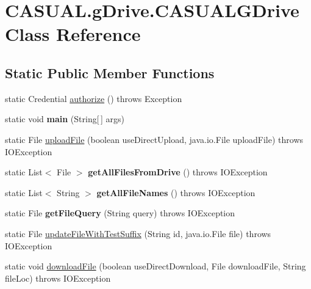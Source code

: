 \hypertarget{classCASUAL_1_1gDrive_1_1CASUALGDrive}{\section{C\-A\-S\-U\-A\-L.\-g\-Drive.\-C\-A\-S\-U\-A\-L\-G\-Drive Class Reference}
\label{classCASUAL_1_1gDrive_1_1CASUALGDrive}
}
\subsection*{Static Public Member Functions}
\begin{DoxyCompactItemize}
\item 
static Credential \hyperlink{classCASUAL_1_1gDrive_1_1CASUALGDrive_ab0165abaa127f7c5d85be97ecabbb383}{authorize} ()  throws Exception 
\item 
\hypertarget{classCASUAL_1_1gDrive_1_1CASUALGDrive_a6efc668bbf4bb5138006248cbe98a3c1}{static void {\bfseries main} (String\mbox{[}$\,$\mbox{]} args)}\label{classCASUAL_1_1gDrive_1_1CASUALGDrive_a6efc668bbf4bb5138006248cbe98a3c1}

\item 
static File \hyperlink{classCASUAL_1_1gDrive_1_1CASUALGDrive_a1da14b5175423bd7fe54003577ee7462}{upload\-File} (boolean use\-Direct\-Upload, java.\-io.\-File upload\-File)  throws I\-O\-Exception 
\item 
\hypertarget{classCASUAL_1_1gDrive_1_1CASUALGDrive_ab303c515c64dc4929186b85e8daaf271}{static List$<$ File $>$ {\bfseries get\-All\-Files\-From\-Drive} ()  throws I\-O\-Exception     }\label{classCASUAL_1_1gDrive_1_1CASUALGDrive_ab303c515c64dc4929186b85e8daaf271}

\item 
\hypertarget{classCASUAL_1_1gDrive_1_1CASUALGDrive_ae8429a953c5ba0c50e26d6770ce45908}{static List$<$ String $>$ {\bfseries get\-All\-File\-Names} ()  throws I\-O\-Exception }\label{classCASUAL_1_1gDrive_1_1CASUALGDrive_ae8429a953c5ba0c50e26d6770ce45908}

\item 
\hypertarget{classCASUAL_1_1gDrive_1_1CASUALGDrive_a4761af4b083cec83c9719f8bc8fbfd7c}{static File {\bfseries get\-File\-Query} (String query)  throws I\-O\-Exception       }\label{classCASUAL_1_1gDrive_1_1CASUALGDrive_a4761af4b083cec83c9719f8bc8fbfd7c}

\item 
static File \hyperlink{classCASUAL_1_1gDrive_1_1CASUALGDrive_ac88c1b89f50ee1045540d33ff3e8bf1d}{update\-File\-With\-Test\-Suffix} (String id, java.\-io.\-File file)  throws I\-O\-Exception 
\item 
static void \hyperlink{classCASUAL_1_1gDrive_1_1CASUALGDrive_af88eb897e7c2f6011f5ac2ed061b1a2c}{download\-File} (boolean use\-Direct\-Download, File download\-File, String file\-Loc)  throws I\-O\-Exception 
\end{DoxyCompactItemize}
